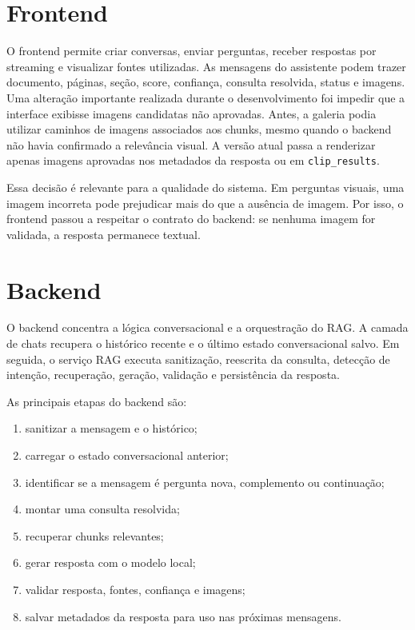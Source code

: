 \section{Frontend}

O frontend permite criar conversas, enviar perguntas, receber respostas por streaming e visualizar fontes utilizadas. As mensagens do assistente podem trazer documento, páginas, seção, score, confiança, consulta resolvida, status e imagens. Uma alteração importante realizada durante o desenvolvimento foi impedir que a interface exibisse imagens candidatas não aprovadas. Antes, a galeria podia utilizar caminhos de imagens associados aos chunks, mesmo quando o backend não havia confirmado a relevância visual. A versão atual passa a renderizar apenas imagens aprovadas nos metadados da resposta ou em \texttt{clip\_results}.

Essa decisão é relevante para a qualidade do sistema. Em perguntas visuais, uma imagem incorreta pode prejudicar mais do que a ausência de imagem. Por isso, o frontend passou a respeitar o contrato do backend: se nenhuma imagem for validada, a resposta permanece textual.

\section{Backend}

O backend concentra a lógica conversacional e a orquestração do RAG. A camada de chats recupera o histórico recente e o último estado conversacional salvo. Em seguida, o serviço RAG executa sanitização, reescrita da consulta, detecção de intenção, recuperação, geração, validação e persistência da resposta.

As principais etapas do backend são:

\begin{enumerate}
  \item sanitizar a mensagem e o histórico;
  \item carregar o estado conversacional anterior;
  \item identificar se a mensagem é pergunta nova, complemento ou continuação;
  \item montar uma consulta resolvida;
  \item recuperar chunks relevantes;
  \item gerar resposta com o modelo local;
  \item validar resposta, fontes, confiança e imagens;
  \item salvar metadados da resposta para uso nas próximas mensagens.
\end{enumerate}

